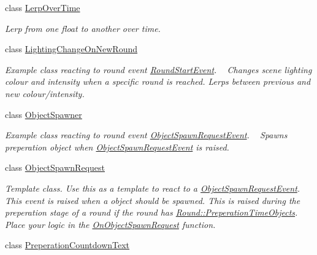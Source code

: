 \begin{DoxyCompactItemize}
class \hyperlink{class_round_manager_1_1_lerp_over_time}{Lerp\+Over\+Time}
\begin{DoxyCompactList}\small\item\em Lerp from one float to another over time. \end{DoxyCompactList}\item 
class \hyperlink{class_round_manager_1_1_lighting_change_on_new_round}{Lighting\+Change\+On\+New\+Round}
\begin{DoxyCompactList}\small\item\em Example class reacting to round event \hyperlink{class_round_manager_1_1_events_1_1_round_start_event}{Round\+Start\+Event}. ~\newline
Changes scene lighting colour and intensity when a specific round is reached. Lerps between previous and new colour/intensity. \end{DoxyCompactList}\item 
class \hyperlink{class_round_manager_1_1_object_spawner}{Object\+Spawner}
\begin{DoxyCompactList}\small\item\em Example class reacting to round event \hyperlink{class_round_manager_1_1_events_1_1_object_spawn_request_event}{Object\+Spawn\+Request\+Event}. ~\newline
Spawns preperation object when \hyperlink{class_round_manager_1_1_events_1_1_object_spawn_request_event}{Object\+Spawn\+Request\+Event} is raised. ~\newline
\end{DoxyCompactList}\item 
class \hyperlink{class_round_manager_1_1_object_spawn_request}{Object\+Spawn\+Request}
\begin{DoxyCompactList}\small\item\em Template class. Use this as a template to react to a \hyperlink{class_round_manager_1_1_events_1_1_object_spawn_request_event}{Object\+Spawn\+Request\+Event}. This event is raised when a object should be spawned. This is raised during the preperation stage of a round if the round has \hyperlink{class_round_manager_1_1_round_a1e58477543ce08f5fd2a436ebadbcc7c}{Round\+::\+Preperation\+Time\+Objects}. Place your logic in the \hyperlink{class_round_manager_1_1_object_spawn_request_a79308b31355872f486b2c9157eea12b6}{On\+Object\+Spawn\+Request} function. \end{DoxyCompactList}\item 
class \hyperlink{class_round_manager_1_1_preperation_countdown_text}{Preperation\+Countdown\+Text}

\end{DoxyCompactItemize}
